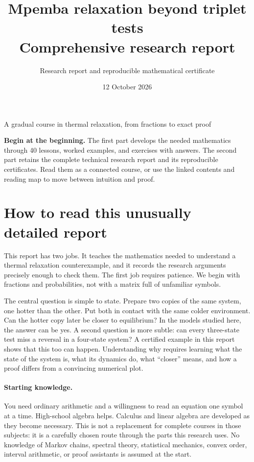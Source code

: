 \documentclass[11pt]{article}
\title{Mpemba relaxation beyond triplet tests\\[0.4em]\large Comprehensive research report}
\author{Research report and reproducible mathematical certificate}
\date{12 October 2026}
\begin{document}
\maketitle
\begin{center}
\large A gradual course in thermal relaxation, from fractions to exact proof
\end{center}
\vspace{1em}
\noindent\textbf{Begin at the beginning.} The first part develops the needed
mathematics through 40 lessons, worked examples, and exercises with answers.
The second part retains the complete technical research report and its
reproducible certificates. Read them as a connected course, or use the
linked contents and reading map to move between intuition and proof.
\clearpage
\section*{How to read this unusually detailed report}
This report has two jobs. It teaches the mathematics needed to understand a
thermal relaxation counterexample, and it records the research arguments
precisely enough to check them. The first job requires patience. We begin with
fractions and probabilities, not with a matrix full of unfamiliar symbols.

The central question is simple to state. Prepare two copies of the same system,
one hotter than the other. Put both in contact with the same colder environment.
Can the hotter copy later be closer to equilibrium? In the models studied here,
the answer can be yes. A second question is more subtle: can every three-state
test miss a reversal in a four-state system? A certified example in this report
shows that this too can happen. Understanding why requires learning what the
state of the system is, what its dynamics do, what ``closer'' means, and how a
proof differs from a convincing numerical plot.

\paragraph{Starting knowledge.}
You need ordinary arithmetic and a willingness to read an equation one symbol
at a time. High-school algebra helps. Calculus and linear algebra are developed
as they become necessary. This is not a replacement for complete courses in
those subjects: it is a carefully chosen route through the parts this research
uses. No knowledge of Markov chains, spectral theory, statistical mechanics,
convex order, interval arithmetic, or proof assistants is assumed at the start.
\end{document}
